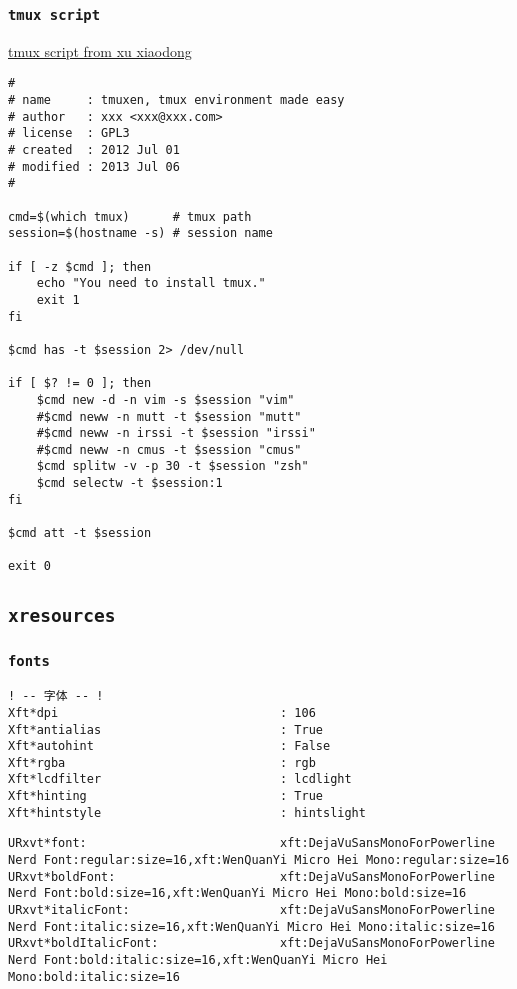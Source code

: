 \documentclass[11pt]{article}
\begin{document}
\subsubsection{\texttt{tmux script}}
\label{sec:orgc644b87}

\href{https://github.com/xuxiaodong/tmuxen}{tmux script from xu xiaodong}

\lstset{language=bash,label= ,caption= ,captionpos=b,numbers=none}
\begin{lstlisting}
#
# name     : tmuxen, tmux environment made easy
# author   : xxx <xxx@xxx.com>
# license  : GPL3
# created  : 2012 Jul 01
# modified : 2013 Jul 06
#

cmd=$(which tmux)      # tmux path
session=$(hostname -s) # session name

if [ -z $cmd ]; then
    echo "You need to install tmux."
    exit 1
fi

$cmd has -t $session 2> /dev/null

if [ $? != 0 ]; then
    $cmd new -d -n vim -s $session "vim"
    #$cmd neww -n mutt -t $session "mutt"
    #$cmd neww -n irssi -t $session "irssi"
    #$cmd neww -n cmus -t $session "cmus"
    $cmd splitw -v -p 30 -t $session "zsh"
    $cmd selectw -t $session:1
fi

$cmd att -t $session

exit 0
\end{lstlisting}

\subsection{\texttt{xresources}}
\label{sec:org680d6d4}

\subsubsection{\texttt{fonts}}
\label{sec:org4396fa9}

\lstset{language=conf-xdefaults,label= ,caption= ,captionpos=b,numbers=none}
\begin{lstlisting}
! -- 字体 -- !
Xft*dpi                               : 106
Xft*antialias                         : True
Xft*autohint                          : False
Xft*rgba                              : rgb
Xft*lcdfilter                         : lcdlight
Xft*hinting                           : True
Xft*hintstyle                         : hintslight
\end{lstlisting}

\lstset{language=conf-xdefaults,label= ,caption= ,captionpos=b,numbers=none}
\begin{lstlisting}
URxvt*font:                           xft:DejaVuSansMonoForPowerline Nerd Font:regular:size=16,xft:WenQuanYi Micro Hei Mono:regular:size=16
URxvt*boldFont:                       xft:DejaVuSansMonoForPowerline Nerd Font:bold:size=16,xft:WenQuanYi Micro Hei Mono:bold:size=16
URxvt*italicFont:                     xft:DejaVuSansMonoForPowerline Nerd Font:italic:size=16,xft:WenQuanYi Micro Hei Mono:italic:size=16
URxvt*boldItalicFont:                 xft:DejaVuSansMonoForPowerline Nerd Font:bold:italic:size=16,xft:WenQuanYi Micro Hei Mono:bold:italic:size=16
\end{lstlisting}
\end{document}
